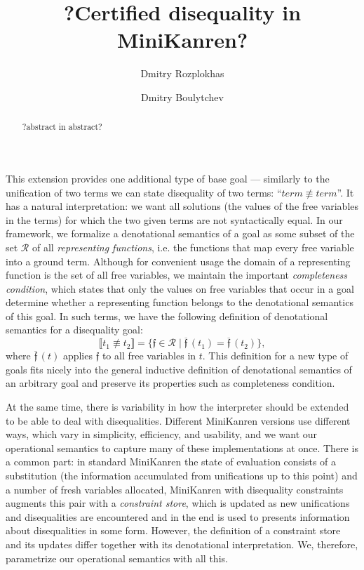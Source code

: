 \documentclass[submission,copyright,creativecommons]{eptcs}
\title{?Certified disequality in MiniKanren?}
\author{Dmitry Rozplokhas
\institute{Higher School of Economics and \\ JetBrains Research, Russia}
\email{rozplokhas@edu.hse.ru}
\and
Dmitry Boulytchev
\institute{Saint Petersburg State University and \\ JetBrains Research, Russia}
\email{dboulytchev@math.spbu.ru}
}
\newcommand{\sembr}[1]{\llbracket{#1}\rrbracket}
\newcommand{\diseq}{\not\equiv}
\newcommand{\reprfunset}{\mathcal{R}}
\newcommand{\reprfun}{\mathfrak{f}}
\begin{document}
\maketitle

\begin{abstract}
?abstract in abstract?
\end{abstract}

This extension provides one additional type of base goal --- similarly to the unification of two terms we can state disequality of two terms: ``$term \diseq term$''. It has a natural interpretation: we want all solutions (the values of the free variables in the terms) for which the two given terms are not syntactically equal. In our framework, we formalize a denotational semantics of a goal as some subset of the set $\reprfunset$ of all \emph{representing functions}, i.e. the functions that map every free variable into a ground term. Although for convenient usage the domain of a representing function is the set of all free variables, we maintain the important \emph{completeness condition}, which states that only the values on free variables that occur in a goal determine whether a representing function belongs to the denotational semantics of this goal. In such terms, we have the following definition of denotational semantics for a disequality goal: \[ \sembr{t_1 \diseq t_2}  =  \{\reprfun \in \reprfunset \mid \overline{\reprfun}\,(t_1)=\overline{\reprfun}\,(t_2)\}, \] where $\overline{\reprfun}\,(t)$ applies $\reprfun$ to all free variables in $t$. This definition for a new type of goals fits nicely into the general inductive definition of denotational semantics of an arbitrary goal and preserve its properties such as completeness condition.

At the same time, there is variability in how the interpreter should be extended to be able to deal with disequalities. Different MiniKanren versions use different ways, which vary in simplicity, efficiency, and usability, and we want our operational semantics to capture many of these implementations at once. There is a common part: in standard MiniKanren the state of evaluation consists of a substitution (the information accumulated from unifications up to this point) and a number of fresh variables allocated, MiniKanren with disequality constraints augments this pair with a \emph{constraint store}, which is updated as new unifications and disequalities are encountered and in the end is used to presents information about disequalities in some form. However, the definition of a constraint store and its updates differ together with its denotational interpretation. We, therefore, parametrize our operational semantics with all this.
\end{document}
